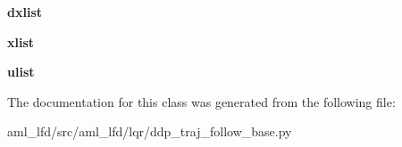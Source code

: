 \begin{DoxyCompactItemize}
{\bfseries dxlist}
\item 
\hypertarget{classaml__lfd_1_1lqr_1_1ddp__traj__follow__base_1_1_d_d_p_traj_follow_a737296883bc4be3b617e584833125ed3}{}\label{classaml__lfd_1_1lqr_1_1ddp__traj__follow__base_1_1_d_d_p_traj_follow_a737296883bc4be3b617e584833125ed3} 
{\bfseries xlist}
\item 
\hypertarget{classaml__lfd_1_1lqr_1_1ddp__traj__follow__base_1_1_d_d_p_traj_follow_a23c501383ace126e72954a4e9e3138f1}{}\label{classaml__lfd_1_1lqr_1_1ddp__traj__follow__base_1_1_d_d_p_traj_follow_a23c501383ace126e72954a4e9e3138f1} 
{\bfseries ulist}
\end{DoxyCompactItemize}


The documentation for this class was generated from the following file\+:\begin{DoxyCompactItemize}
\item 
aml\+\_\+lfd/src/aml\+\_\+lfd/lqr/ddp\+\_\+traj\+\_\+follow\+\_\+base.\+py\end{DoxyCompactItemize}
